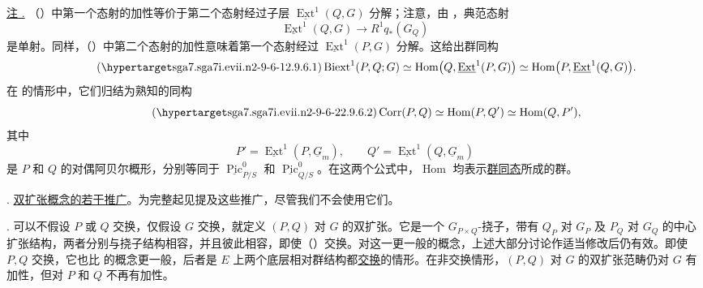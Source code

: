 \underline{注 .} （）中第一个态射的加性等价于第二个态射经过子层 $\underline{\operatorname{Ext}}^1(Q,G)$ 分解；注意，由 ，典范态射
\[
 \underline{\operatorname{Ext}}^1(Q,G)
 \longrightarrow R^1q_*(G_Q)
\]
是单射。同样，（）中第二个态射的加性意味着第一个态射经过 $\underline{\operatorname{Ext}}^1(P,G)$ 分解。这给出群同构
\begin{equation}\tag{\SGARefTarget{sga7.sga7i.evii.n2-9-6-1}{2.9.6.1}}
 \operatorname{Biext}^{1}(P,Q;G)
 \simeq
 \operatorname{Hom}\bigl(Q,\underline{\operatorname{Ext}}^1(P,G)\bigr)
 \simeq
 \operatorname{Hom}\bigl(P,\underline{\operatorname{Ext}}^1(Q,G)\bigr).
\end{equation}
在  的情形中，它们归结为熟知的同构
\begin{equation}\tag{\SGARefTarget{sga7.sga7i.evii.n2-9-6-2}{2.9.6.2}}
 \operatorname{Corr}(P,Q)
 \simeq \operatorname{Hom}(P,Q')
 \simeq \operatorname{Hom}(Q,P'),
\end{equation}
其中
\[
 P'=\underline{\operatorname{Ext}}^1(P,\underline G_m),
 \qquad
 Q'=\underline{\operatorname{Ext}}^1(Q,\underline G_m)
\]
是 $P$ 和 $Q$ 的对偶阿贝尔概形，分别等同于 $\underline{\operatorname{Pic}}^0_{P/S}$ 和 $\underline{\operatorname{Pic}}^0_{Q/S}$。在这两个公式中，$\operatorname{Hom}$ 均表示\underline{群同态}所成的群。




. \underline{双扩张概念的若干推广}。为完整起见提及这些推广，尽管我们不会使用它们。

. 可以不假设 $P$ 或 $Q$ 交换，仅假设 $G$ 交换，就定义 $(P,Q)$ 对 $G$ 的双扩张。它是一个 $G_{P\times Q}$-挠子，带有 $Q_P$ 对 $G_P$ 及 $P_Q$ 对 $G_Q$ 的中心扩张结构，两者分别与挠子结构相容，并且彼此相容，即使（）交换。对这一更一般的概念，上述大部分讨论作适当修改后仍有效。即使 $P,Q$ 交换，它也比  的概念更一般，后者是 $E$ 上两个底层相对群结构都\underline{交换}的情形。在非交换情形，$(P,Q)$ 对 $G$ 的双扩张范畴仍对 $G$ 有加性，但对 $P$ 和 $Q$ 不再有加性。

